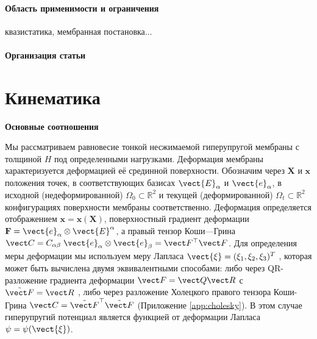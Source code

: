 
\paragraph{Область применимости и ограничения}
квазистатика, мембранная постановка...

\paragraph{Организация статьи}

\section{Кинематика}
\textbf{Основные соотношения}

Мы рассматриваем равновесие тонкой несжимаемой гиперупругой мембраны с толщиной $H$ под
определенными нагрузками.
Деформация мембраны характеризуется деформацией её срединной поверхности. 
Обозначим через \(\mathbf{X}\) и \(\mathbf{x}\) положения точек, 
в соответствующих базисах \(\vect{E}_{\alpha}\) и \(\vect{e}_{\alpha}\), 
в исходной (недеформированной) \(\Omega_0 \subset \mathbb{R}^2\) и текущей (деформированной) \(\Omega_t \subset \mathbb{R}^2\)
конфигурациях поверхности мембраны соответственно. 
Деформация определяется отображением \(\mathbf{x} = \mathbf{x}(\mathbf{X})\), 
поверхностный градиент деформации \(\mathbf{F} = \vect{e}_{\alpha} \otimes \vect{E}^{\alpha}\),
а правый тензор Коши—Грина \(\vect C = C_{\alpha\beta} \;\vect{e}_{\alpha} \otimes \vect{e}_{\beta} = \vect F^{\top} \vect F\). 
Для определения меры деформации мы используем меру Лапласа \(\vect{\xi} = (\xi_1 , \xi_2 , \xi_3)^T\) \cite{xi2023},
которая может быть вычислена двумя эквивалентными способами: 
либо через QR-разложение градиента деформации \(\vect F = \vect Q \vect R\) с \(\tilde{\vect F} = \vect R\) , 
либо через разложение Холецкого правого тензора Коши-Грина \(\vect C = \tilde{\vect F}^{\top}\tilde{\vect F}\) (Приложение \ref{app:cholesky}).
В этом случае гиперупругий потенциал является функцией от деформации Лапласа \(\psi = \psi(\vect{\xi})\).



